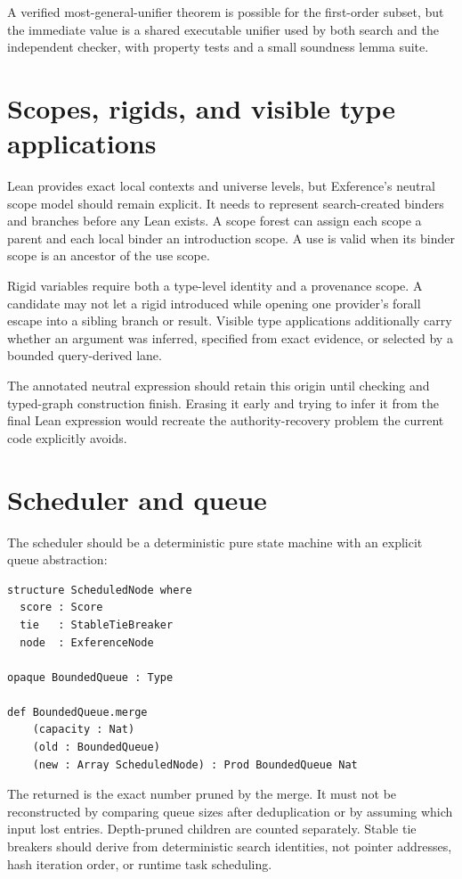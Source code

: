 \documentclass[10pt,letterpaper,oneside]{report}
\newcommand{\code}[1]{\texttt{\detokenize{#1}}}
\begin{document}
A verified most-general-unifier theorem is possible for the first-order subset, but the immediate value is a shared executable unifier used by both search and the independent checker, with property tests and a small soundness lemma suite.

\section{Scopes, rigids, and visible type applications}

Lean provides exact local contexts and universe levels, but Exference's neutral scope model should remain explicit. It needs to represent search-created binders and branches before any Lean \code{FVarId} exists. A scope forest can assign each scope a parent and each local binder an introduction scope. A use is valid when its binder scope is an ancestor of the use scope.

Rigid variables require both a type-level identity and a provenance scope. A candidate may not let a rigid introduced while opening one provider's forall escape into a sibling branch or result. Visible type applications additionally carry whether an argument was inferred, specified from exact evidence, or selected by a bounded query-derived lane.

The annotated neutral expression should retain this origin until checking and typed-graph construction finish. Erasing it early and trying to infer it from the final Lean expression would recreate the authority-recovery problem the current code explicitly avoids.

\section{Scheduler and queue}

The scheduler should be a deterministic pure state machine with an explicit queue abstraction:

\begin{lstlisting}[language=Leanish]
structure ScheduledNode where
  score : Score
  tie   : StableTieBreaker
  node  : ExferenceNode

opaque BoundedQueue : Type

def BoundedQueue.merge
    (capacity : Nat)
    (old : BoundedQueue)
    (new : Array ScheduledNode) : Prod BoundedQueue Nat
\end{lstlisting}

The returned \code{Nat} is the exact number pruned by the merge. It must not be reconstructed by comparing queue sizes after deduplication or by assuming which input lost entries. Depth-pruned children are counted separately. Stable tie breakers should derive from deterministic search identities, not pointer addresses, hash iteration order, or runtime task scheduling.
\end{document}
